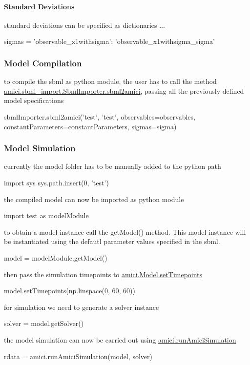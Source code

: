 \paragraph*{Standard Deviations}

standard deviations can be specified as dictionaries ... \begin{DoxyVerb}sigmas = {'observable_x1withsigma': 'observable_x1withsigma_sigma'}
\end{DoxyVerb}


\subsubsection*{Model Compilation}

to compile the sbml as python module, the user has to call the method {\ttfamily \mbox{\hyperlink{classamici_1_1sbml__import_1_1_sbml_importer_a83900bb62c0121eb798939a6d4232a9c}{amici.\+sbml\+\_\+import.\+Sbml\+Importer.\+sbml2amici}}}, passing all the previously defined model specifications \begin{DoxyVerb}sbmlImporter.sbml2amici('test', 'test', 
                        observables=observables,
                        constantParameters=constantParameters,
                        sigmas=sigma)
\end{DoxyVerb}


\subsubsection*{Model Simulation}

currently the model folder has to be manually added to the python path \begin{DoxyVerb}import sys
sys.path.insert(0, 'test')
\end{DoxyVerb}


the compiled model can now be imported as python module \begin{DoxyVerb}import test as modelModule
\end{DoxyVerb}


to obtain a model instance call the {\ttfamily get\+Model()} method. This model instance will be instantiated using the defautl parameter values specified in the sbml. \begin{DoxyVerb}model = modelModule.getModel()
\end{DoxyVerb}


then pass the simulation timepoints to {\ttfamily \mbox{\hyperlink{classamici_1_1_model_a50f9642f9bcb883dbd3925c85abc4c24}{amici.\+Model.\+set\+Timepoints}}} \begin{DoxyVerb}model.setTimepoints(np.linspace(0, 60, 60)) 
\end{DoxyVerb}


for simulation we need to generate a solver instance \begin{DoxyVerb}solver = model.getSolver()
\end{DoxyVerb}


the model simulation can now be carried out using {\ttfamily \mbox{\hyperlink{namespaceamici_a46331a204e7511587acc2cc0b1ce7ed0}{amici.\+run\+Amici\+Simulation}}} \begin{DoxyVerb}rdata = amici.runAmiciSimulation(model, solver)\end{DoxyVerb}
 